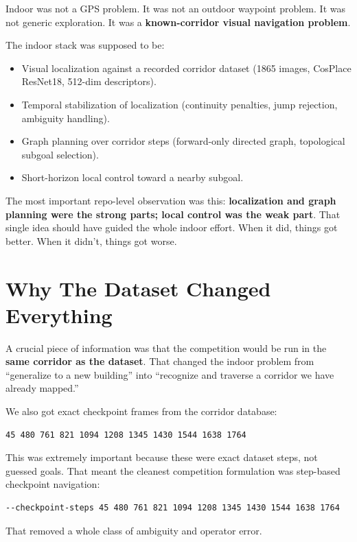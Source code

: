 \documentclass[11pt]{article}
\begin{document}
Indoor was not a GPS problem. It was not an outdoor waypoint problem. It was not generic exploration. It was a \textbf{known-corridor visual navigation problem}.

The indoor stack was supposed to be:
\begin{itemize}
\item Visual localization against a recorded corridor dataset (1865 images, CosPlace ResNet18, 512-dim descriptors).
\item Temporal stabilization of localization (continuity penalties, jump rejection, ambiguity handling).
\item Graph planning over corridor steps (forward-only directed graph, topological subgoal selection).
\item Short-horizon local control toward a nearby subgoal.
\end{itemize}

The most important repo-level observation was this: \textbf{localization and graph planning were the strong parts; local control was the weak part}. That single idea should have guided the whole indoor effort. When it did, things got better. When it didn't, things got worse.


\section{Why The Dataset Changed Everything}

A crucial piece of information was that the competition would be run in the \textbf{same corridor as the dataset}. That changed the indoor problem from ``generalize to a new building'' into ``recognize and traverse a corridor we have already mapped.''

We also got exact checkpoint frames from the corridor database:
\begin{lstlisting}
45 480 761 821 1094 1208 1345 1430 1544 1638 1764
\end{lstlisting}

This was extremely important because these were exact dataset steps, not guessed goals. That meant the cleanest competition formulation was step-based checkpoint navigation:
\begin{lstlisting}
--checkpoint-steps 45 480 761 821 1094 1208 1345 1430 1544 1638 1764
\end{lstlisting}

That removed a whole class of ambiguity and operator error.
\end{document}
